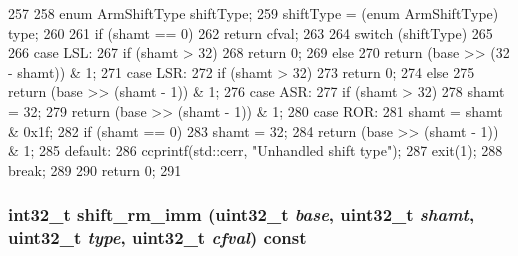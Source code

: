 \begin{DoxyCode}
257 {
258     enum ArmShiftType shiftType;
259     shiftType = (enum ArmShiftType) type;
260 
261     if (shamt == 0)
262         return cfval;
263 
264     switch (shiftType)
265     {
266       case LSL:
267         if (shamt > 32)
268             return 0;
269         else
270             return (base >> (32 - shamt)) & 1;
271       case LSR:
272         if (shamt > 32)
273             return 0;
274         else
275             return (base >> (shamt - 1)) & 1;
276       case ASR:
277         if (shamt > 32)
278             shamt = 32;
279         return (base >> (shamt - 1)) & 1;
280       case ROR:
281         shamt = shamt & 0x1f;
282         if (shamt == 0)
283             shamt = 32;
284         return (base >> (shamt - 1)) & 1;
285       default:
286         ccprintf(std::cerr, "Unhandled shift type\n");
287         exit(1);
288         break;
289     }
290     return 0;
291 }
\end{DoxyCode}
\hypertarget{classArmISA_1_1ArmStaticInst_a3bf2cda24ceeea2d93bb03f88ddeec19}{
\subsubsection[{shift\_\-rm\_\-imm}]{\setlength{\rightskip}{0pt plus 5cm}int32\_\-t shift\_\-rm\_\-imm ({\bf uint32\_\-t} {\em base}, \/  {\bf uint32\_\-t} {\em shamt}, \/  {\bf uint32\_\-t} {\em type}, \/  {\bf uint32\_\-t} {\em cfval}) const}}
\label{classArmISA_1_1ArmStaticInst_a3bf2cda24ceeea2d93bb03f88ddeec19}



